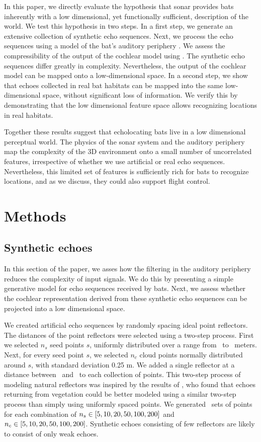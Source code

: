 \documentclass[preprint,5p]{elsarticle}
\begin{document}
In this paper, we directly evaluate the hypothesis that sonar provides bats inherently with a low dimensional, yet functionally sufficient, description of the world. We test this hypothesis in two steps. In a first step, we generate an extensive collection of synthetic echo sequences. Next, we process the echo sequences using a model of the bat's auditory periphery \citep{Wiegrebe2008}. We assess the compressibility of the output of the cochlear model using \PCA. The synthetic echo sequences differ greatly in complexity. Nevertheless, the output of the cochlear model can be mapped onto a low-dimensional space. In a second step, we show that echoes collected in real bat habitats can be mapped into the same low-dimensional space, without significant loss of information. We verify this by demonstrating that the low dimensional feature space allows recognizing locations in real habitats. 

Together these results suggest that echolocating bats live in a low dimensional perceptual world. The physics of the sonar system and the auditory periphery map the complexity of the 3D environment onto a small number of uncorrelated features, irrespective of whether we use artificial or real echo sequences. Nevertheless, this limited set of features is sufficiently rich for bats to recognize locations, and as we discuss, they could also support flight control.

\section{Methods}

\subsection{Synthetic echoes}

In this section of the paper, we asses how the filtering in the auditory periphery reduces the complexity of input signals. We do this by presenting a simple generative model for echo sequences received by bats. Next, we assess whether the cochlear representation derived from these synthetic echo sequences can be projected into a low dimensional space. 

We created artificial echo sequences by randomly spacing ideal point reflectors. The distances of the point reflectors were selected using a two-step process. First we selected $n_{s}$ seed points $s$, uniformly distributed over a range from \MinDistance\ to \MaxDistance\ meters. Next, for every seed point $s$, we selected $n_{c}$ cloud points normally distributed around $s$, with standard deviation 0.25 m. We added a single reflector at a distance between \MinDistanceFirst\ and \MaxDistanceFirst\ to each collection of points. This two-step process of modeling natural reflectors was inspired by the results of \citet{Yovel2009}, who found that echoes returning from vegetation could be better modeled using a similar two-step process than simply using uniformly spaced points. We generated \GenerateRepeats\ sets of points for each combination of $n_s \in [5, 10, 20, 50, 100, 200]$ and $n_c \in [5, 10, 20, 50, 100, 200]$. Synthetic echoes consisting of few reflectors are likely to consist of only weak echoes.
\end{document}
